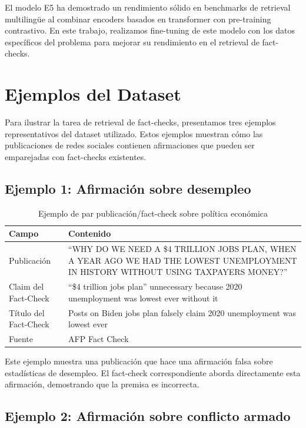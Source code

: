 \documentclass[a4paper,openany]{memoir}
\begin{document}
El modelo E5 \cite{wang2024multilingual} ha demostrado un rendimiento sólido en benchmarks de retrieval multilingüe \cite{zhang2021mrtydimultilingualbenchmark} al combinar encoders basados en transformer con pre-training contrastivo. En este trabajo, realizamos fine-tuning de este modelo con los datos específicos del problema para mejorar su rendimiento en el retrieval de fact-checks.

\chapter{Ejemplos del Dataset}

Para ilustrar la tarea de retrieval de fact-checks, presentamos tres ejemplos representativos del dataset utilizado. Estos ejemplos muestran cómo las publicaciones de redes sociales contienen afirmaciones que pueden ser emparejadas con fact-checks existentes.

\section{Ejemplo 1: Afirmación sobre desempleo}

\begin{table}[htbp]
\centering
\caption{Ejemplo de par publicación/fact-check sobre política económica}
\label{tab:ejemplo1}
\begin{tabular}{p{3cm}p{10cm}}
\toprule
\textbf{Campo} & \textbf{Contenido} \\
\midrule
Publicación & ``WHY DO WE NEED A \$4 TRILLION JOBS PLAN, WHEN A YEAR AGO WE HAD THE LOWEST UNEMPLOYMENT IN HISTORY WITHOUT USING TAXPAYERS MONEY?'' \\
\midrule
Claim del Fact-Check & ``\$4 trillion jobs plan'' unnecessary because 2020 unemployment was lowest ever without it \\
\midrule
Título del Fact-Check & Posts on Biden jobs plan falsely claim 2020 unemployment was lowest ever \\
\midrule
Fuente & AFP Fact Check \\
\bottomrule
\end{tabular}
\end{table}

Este ejemplo muestra una publicación que hace una afirmación falsa sobre estadísticas de desempleo. El fact-check correspondiente aborda directamente esta afirmación, demostrando que la premisa es incorrecta.

\section{Ejemplo 2: Afirmación sobre conflicto armado}
\end{document}
